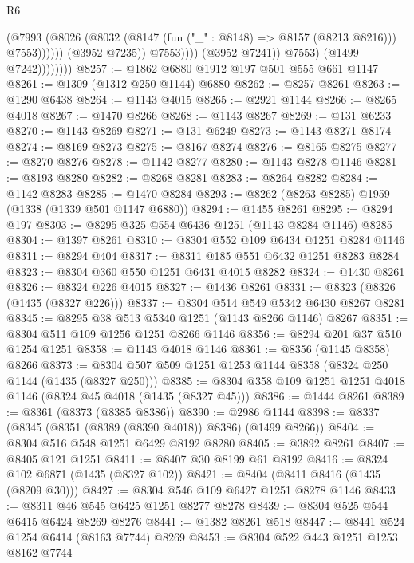\begin{lexlean}{R6}
\begin{coremodule}
                                      (@7993
                                        (@8026
                                          (@8032
                                            (@8147 (fun ("_" : @8148) => @8157 (@8213 @8216)))
                                            @7553))))))
                                (@3952 @7235))
                              @7553))))
                      (@3952 @7241))
                    @7553)
                  (@1499 @7242))))))))
@8257 := @1862 @6880 @1912 @197 @501 @555 @661 @1147
@8261 := @1309 (@1312 @250 @1144) @6880
@8262 := @8257 @8261
@8263 := @1290 @6438
@8264 := @1143 @4015
@8265 := @2921 @1144
@8266 := @8265 @4018
@8267 := @1470 @8266
@8268 := @1143 @8267
@8269 := @131 @6233
@8270 := @1143 @8269
@8271 := @131 @6249
@8273 := @1143 @8271 @8174
@8274 := @8169 @8273
@8275 := @8167 @8274
@8276 := @8165 @8275
@8277 := @8270 @8276
@8278 := @1142 @8277
@8280 := @1143 @8278 @1146
@8281 := @8193 @8280
@8282 := @8268 @8281
@8283 := @8264 @8282
@8284 := @1142 @8283
@8285 := @1470 @8284
@8293 := @8262 (@8263 @8285) @1959 (@1338 (@1339 @501 @1147 @6880))
@8294 := @1455 @8261
@8295 := @8294 @197
@8303 := @8295 @325 @554 @6436 @1251 (@1143 @8284 @1146) @8285
@8304 := @1397 @8261
@8310 := @8304 @552 @109 @6434 @1251 @8284 @1146
@8311 := @8294 @404
@8317 := @8311 @185 @551 @6432 @1251 @8283 @8284
@8323 := @8304 @360 @550 @1251 @6431 @4015 @8282
@8324 := @1430 @8261
@8326 := @8324 @226 @4015
@8327 := @1436 @8261
@8331 := @8323 (@8326 (@1435 (@8327 @226)))
@8337 := @8304 @514 @549 @5342 @6430 @8267 @8281
@8345 := @8295 @38 @513 @5340 @1251 (@1143 @8266 @1146) @8267
@8351 := @8304 @511 @109 @1256 @1251 @8266 @1146
@8356 := @8294 @201 @37 @510 @1254 @1251
@8358 := @1143 @4018 @1146
@8361 := @8356 (@1145 @8358) @8266
@8373 := @8304 @507 @509 @1251 @1253 @1144 @8358 (@8324 @250 @1144 (@1435 (@8327 @250)))
@8385 := @8304 @358 @109 @1251 @1251 @4018 @1146 (@8324 @45 @4018 (@1435 (@8327 @45)))
@8386 := @1444 @8261
@8389 := @8361 (@8373 (@8385 @8386))
@8390 := @2986 @1144
@8398 := @8337 (@8345 (@8351 (@8389 (@8390 @4018)) @8386) (@1499 @8266))
@8404 := @8304 @516 @548 @1251 @6429 @8192 @8280
@8405 := @3892 @8261
@8407 := @8405 @121 @1251
@8411 := @8407 @30 @8199 @61 @8192
@8416 := @8324 @102 @6871 (@1435 (@8327 @102))
@8421 := @8404 (@8411 @8416 (@1435 (@8209 @30)))
@8427 := @8304 @546 @109 @6427 @1251 @8278 @1146
@8433 := @8311 @46 @545 @6425 @1251 @8277 @8278
@8439 := @8304 @525 @544 @6415 @6424 @8269 @8276
@8441 := @1382 @8261 @518
@8447 := @8441 @524 @1254 @6414 (@8163 @7744) @8269
@8453 := @8304 @522 @443 @1251 @1253 @8162 @7744

\end{coremodule}
\end{lexlean}
